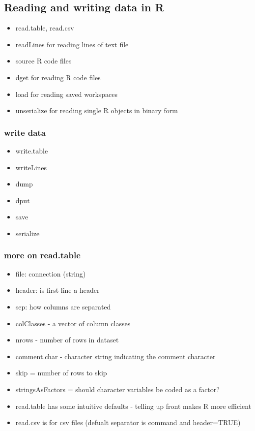 \documentclass[11pt]{article}
\begin{document}
\subsection{Reading and writing data in R}
\label{sec-1-7}

\begin{itemize}
\item read.table, read.csv
\item readLines for reading lines of text file
\item source R code files
\item dget for reading R code files
\item load for reading saved workspaces
\item unserialize for reading single R objects in binary form
\end{itemize}
\subsubsection{write data}
\label{sec-1-7-1}

\begin{itemize}
\item write.table
\item writeLines
\item dump
\item dput
\item save
\item serialize
\end{itemize}
\subsubsection{more on read.table}
\label{sec-1-7-2}

\begin{itemize}
\item file: connection (string)
\item header: is first line a header
\item sep: how columns are separated
\item colClasses - a vector of column classes
\item nrows - number of rows in dataset
\item comment.char - character string indicating the comment character
\item skip = number of rows to skip
\item stringsAsFactors = should character variables be coded as a factor?
\item read.table has some intuitive defaults - telling up front makes R
  more efficient
\item read.csv is for csv files (defualt separator is command and
  header=TRUE)
\end{itemize}
\end{document}
